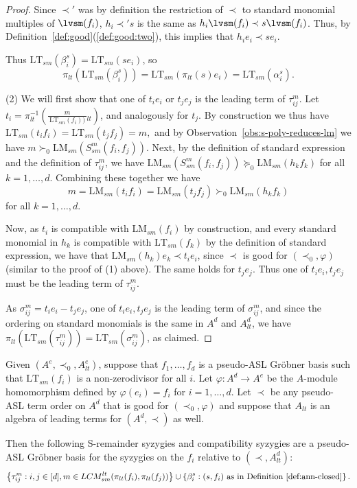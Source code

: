 \documentclass[11pt,reqno]{amsart}
\newcommand{\suchthat}{:}
\newcommand{\ltfrac}[2]{\frac{\,#1\,}{\,#2\,}{}_{{\scriptscriptstyle lt}}}
\newcommand{\lmsm}{\text{LM}_{sm}}
\newcommand{\ltsm}{\text{LT}_{sm}}
\newcommand{\lcmlt}{LCM_{sm}^{lt}}
\newcommand{\Ssm}{S_{sm}}
\newcommand{\piltd}{\pi_{lt}}
\theoremstyle{definition}
\numberwithin{equation}{section}
\begin{document}
\begin{proof}
Since $\prec'$ was by definition the restriction of $\prec$ to standard monomial multiples of $\lvsm(f_i)$, $h_i \prec' s$ is the same as $h_i \lvsm(f_i) \prec s \lvsm(f_i)$. Thus, by Definition~\ref{def:good}(\ref{def:good:two}), this implies that $h_i e_i \prec s e_i$.

Thus $\ltsm(\beta_i^s) = \ltsm( s e_i)$, so 
\[
\piltd(\ltsm(\beta_i^s)) = \ltsm(\pi_{lt}(s) e_i) = \ltsm(\alpha_i^s).
\] 

(2)  We will first show that one of $t_i e_i$ or $t_j e_j$ is the leading term of $\tau_{ij}^m$. Let $t_i=\pi_{lt}^{-1}\left(\ltfrac{m}{\ltsm(f_i))}\right)$, and analogously for $t_j$. By construction we thus have 
\(
\ltsm(t_i f_i) = \ltsm(t_j f_j) = m,
\)
and by Observation~\ref{obs:s-poly-reduces-lm} we have 
\(
m \succ_0 \lmsm(\Ssm^m(f_i, f_j)).
\)
 Next, by the definition of standard expression and the definition of $\tau_{ij}^m$, we have 
 \(
 \lmsm(\Ssm^m(f_i, f_j)) \succeq_0 \lmsm(h_k f_k)
 \)
 for all $k=1,\dotsc,d$. Combining these together we have 
 \[
 m = \lmsm(t_i f_i) = \lmsm(t_j f_j) \succ_0 \lmsm(h_k f_k)
 \]
 for all $k=1,\dotsc,d$. 
 
Now, as $t_i$ is compatible with $\lmsm(f_i)$ by construction, and every standard monomial in $h_k$ is compatible with $\ltsm(f_k)$ by the definition of standard expression, we have that $\lmsm(h_k) e_k \prec t_i e_i$, since $\prec$ is good for $(\prec_0, \varphi)$ (similar to the proof of (1) above). The same holds for $t_j e_j$. Thus one of $t_i e_i, t_j e_j$ must be the leading term of $\tau_{ij}^m$. 

As $\sigma_{ij}^m = t_i e_i - t_j e_j$, one of $t_i e_i, t_j e_j$ is the leading term of $\sigma_{ij}^m$, and since the ordering on standard monomials is the same in $A^d$ and $A_{lt}^d$, we have $\pi_{lt}(\ltsm(\tau_{ij}^m)) = \ltsm(\sigma_{ij}^m)$, as claimed.
\end{proof}

\nocite{eisenbud}
\begin{theorem}[store=thmaslschreyer, note={Pseudo-ASL analogue of Schreyer's Syzygy Theorem, cf. \cite[Theorem~15.10]{eisenbud}}] \label{thm:schreyer}
Given $(A^e, \prec_0, A_{lt}^e)$, suppose that $f_1, \dotsc, f_d$ is a pseudo-ASL Gröbner basis such that $\ltsm(f_i)$ is a non-zerodivisor for all $i$. Let $\varphi \colon A^d \to A^e$ be the $A$-module homomorphism defined by $\varphi(e_i) = f_i$ for $i=1,\dotsc,d$. Let $\prec$ be any pseudo-ASL term order on $A^d$ that is good for $(\prec_0, \varphi)$ and suppose that $A_{lt}$ is an algebra of leading terms for $(A^d,\prec)$ as well. 

Then the following S-remainder syzygies and compatibility syzygies are a pseudo-ASL Gröbner basis for the syzygies on the $f_i$ relative to $(\prec, A_{lt}^d)$:
\[
\left\{\tau_{ij}^m \suchthat i,j \in [d], m \in \lcmlt(\pi_{lt}(f_i), \pi_{lt}(f_j))\right\} \cup \left\{\beta_i^s \suchthat (s,f_i) \text{ as in Definition~\ref{def:ann-closed}}\right\}.
\]
\end{theorem}
\end{document}
